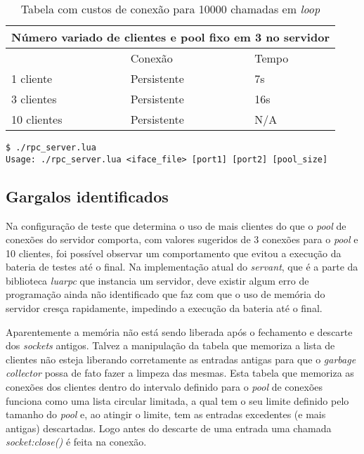 \documentclass[11pt]{article}
\begin{document}
\renewcommand{\arraystretch}{2}
\begin{table}
\begin{center}
{\footnotesize \begin{tabular}{p{2.5cm} p{2.5cm} p{2.5cm}}
\hline
\multicolumn{3}{c}{Número variado de clientes e pool fixo em 3 no servidor} \\ \hline
~ & Conexão & Tempo \\ \hline
1 cliente & Persistente & 7s \\
3 clientes & Persistente & 16s \\
10 clientes & Persistente & N/A \\
\hline
\end{tabular}}
\caption{Tabela com custos de conexão para 10000 chamadas em \textit{loop}}
\label{tab:perfpool}
\end{center}
\end{table}

\begin{lstlisting}[caption={Linha de comando},label={lst:commandline}]
$ ./rpc_server.lua
Usage: ./rpc_server.lua <iface_file> [port1] [port2] [pool_size]
\end{lstlisting}

\subsection{Gargalos identificados}\label{subsec:bottle}

Na configuração de teste que determina o uso de mais clientes do que o
\textit{pool} de conexões do servidor comporta, com valores sugeridos de 3
conexões para o \textit{pool} e 10 clientes, foi possível observar um
comportamento que evitou a execução da bateria de testes até o final. Na
implementação atual do \textit{servant}, que é a parte da biblioteca
\textit{luarpc} que instancia um servidor, deve existir algum erro de
programação ainda não identificado que faz com que o uso de memória do servidor
cresça rapidamente, impedindo a execução da bateria até o final.

Aparentemente a memória não está sendo liberada após o fechamento e descarte dos
\textit{sockets} antigos. Talvez a manipulação da tabela que memoriza a lista de
clientes não esteja liberando corretamente as entradas antigas para que o
\textit{garbage collector} possa de fato fazer a limpeza das mesmas.  Esta
tabela que memoriza as conexões dos clientes dentro do intervalo definido para o
\textit{pool} de conexões funciona como uma lista circular limitada, a qual tem
o seu limite definido pelo tamanho do \textit{pool} e, ao atingir o limite, tem
as entradas excedentes (e mais antigas) descartadas. Logo antes do descarte de
uma entrada uma chamada \textit{socket:close()} é feita na conexão.
\end{document}
